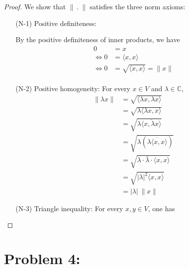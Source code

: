 \documentclass[12pt, reqno]{amsart}
\theoremstyle{definition}
\theoremstyle{remark}
\begin{document}
\begin{proof}
    
We show that $\|~.~\|$ satisfies the three norm axioms:
\begin{itemize}
\item[(N-1)] Positive definiteness: 

By the positive definiteness of inner products, we have \begin{align*}
    0&= x\\
    \iff0&= \langle x,x\rangle\\
    \iff 0&= \sqrt{\langle x,x\rangle}=\|x\|\\
    \end{align*}

\item[(N-2)] Positive homogeneity: For every $x \in V$ and $\lambda \in \mathbb{C}$, 
\begin{align*}
    \|\lambda x\|&= \sqrt{\langle \lambda x,\lambda x\rangle}\\
    &= \sqrt{\lambda\langle \lambda x,x\rangle}\\
    &= \sqrt{\lambda\overline{\langle x,\lambda x\rangle}}\\
    &= \sqrt{\lambda(\overline{\lambda\langle x,x\rangle})}\\
    &= \sqrt{\lambda\cdot \bar \lambda\cdot\langle x,x\rangle}\\
    &= \sqrt{|\lambda|^{2}\langle x,x\rangle}\\
    &= |\lambda|\ \|x\|
    \end{align*}

\item[(N-3)] Triangle inequality: For every $x , y \in V$, one has


\end{itemize}

\end{proof}

\vspace{0.1 cm}

\vspace{0.2 cm}
\section*{Problem 4:}
\end{document}

